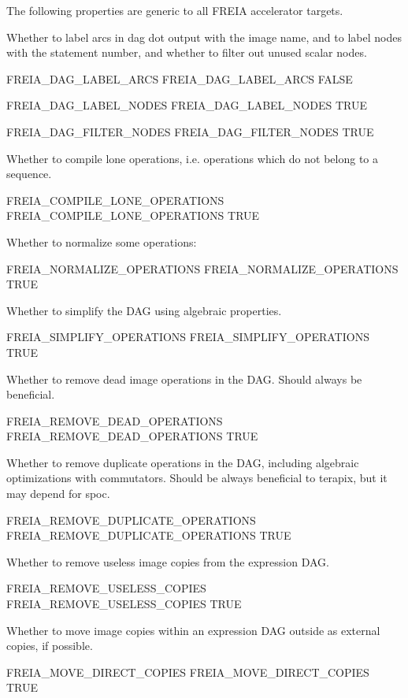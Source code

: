 \documentclass[a4paper]{report}
\begin{document}
The following properties are generic to all FREIA accelerator targets.

Whether to label arcs in dag dot output with the image name,
and to label nodes with the statement number, and whether to
filter out unused scalar nodes.
\begin{PipsProp}{FREIA_DAG_LABEL_ARCS}
FREIA_DAG_LABEL_ARCS FALSE
\end{PipsProp}
\begin{PipsProp}{FREIA_DAG_LABEL_NODES}
FREIA_DAG_LABEL_NODES TRUE
\end{PipsProp}
\begin{PipsProp}{FREIA_DAG_FILTER_NODES}
FREIA_DAG_FILTER_NODES TRUE
\end{PipsProp}

Whether to compile lone operations, i.e. operations which do not
belong to a sequence.
\begin{PipsProp}{FREIA_COMPILE_LONE_OPERATIONS}
FREIA_COMPILE_LONE_OPERATIONS TRUE
\end{PipsProp}

Whether to normalize some operations:
\begin{PipsProp}{FREIA_NORMALIZE_OPERATIONS}
FREIA_NORMALIZE_OPERATIONS TRUE
\end{PipsProp}

Whether to simplify the DAG using algebraic properties.
\begin{PipsProp}{FREIA_SIMPLIFY_OPERATIONS}
FREIA_SIMPLIFY_OPERATIONS TRUE
\end{PipsProp}

Whether to remove dead image operations in the DAG.
Should always be beneficial.
\begin{PipsProp}{FREIA_REMOVE_DEAD_OPERATIONS}
FREIA_REMOVE_DEAD_OPERATIONS TRUE
\end{PipsProp}

Whether to remove duplicate operations in the DAG, including
algebraic optimizations with commutators.
Should be always beneficial to terapix, but it may depend for spoc.
\begin{PipsProp}{FREIA_REMOVE_DUPLICATE_OPERATIONS}
FREIA_REMOVE_DUPLICATE_OPERATIONS TRUE
\end{PipsProp}

Whether to remove useless image copies from the expression DAG.
\begin{PipsProp}{FREIA_REMOVE_USELESS_COPIES}
FREIA_REMOVE_USELESS_COPIES TRUE
\end{PipsProp}

Whether to move image copies within an expression DAG outside
as external copies, if possible.
\begin{PipsProp}{FREIA_MOVE_DIRECT_COPIES}
FREIA_MOVE_DIRECT_COPIES TRUE
\end{PipsProp}
\end{document}
